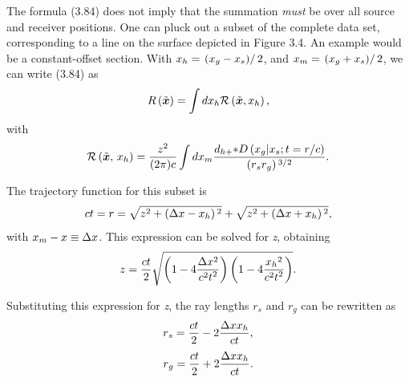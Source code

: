 The formula (3.84) does not imply that the summation \textit{must} be over all source and receiver positions. One can pluck out a subset of the
complete data set, corresponding to a line on the surface depicted in Figure 3.4. An example would be a constant-offset section. With \(x_h=\left.\left(x_g-x_s\right)\right/2\),
and \(x_m=\left.\left(x_g+x_s\right)\right/2\), we can write (3.84) as
\begin{equation}
\text{\textit{$R$}}\left(\tilde{\boldsymbol{x}}\right) = \int d\text{\textit{$x$}}_{\text{\textit{$h$}}}\text{\textit{$\mathcal{R}$}}\left(\tilde{\boldsymbol{x}},\text{\textit{$x_h$}}\right),\end{equation}
with
\begin{equation}\text{\textit{$\mathcal{R}$}}\left(\tilde{\boldsymbol{x}},\,\text{\textit{$x$}}_{\text{\textit{$h$}}}\right)
= \frac{\text{\textit{$z$}}^2}{(2\pi )\text{\textit{$c$}}} \int d\text{\textit{$x$}}_{\text{\textit{$m$}}}\frac{\text{\textit{$d_{h+}$}}\text{\textit{$*$}}\text{\textit{$D$}}\left(\text{\textit{$x$}}_{\text{\textit{$g$}}}|\text{\textit{$x$}}_{\text{\textit{$s$}}};\text{\textit{$t$}}=\text{\textit{$r$}}/\text{\textit{$c$}}\right)}{\left(\text{\textit{$r$}}_{\text{\textit{$s$}}}\text{\textit{$r$}}_{\text{\textit{$g$}}}\right){}^{3/2}}.\end{equation}

The trajectory function for this subset is
\begin{equation}\text{\textit{$c t$}}=\text{\textit{$r$}}=\sqrt{\text{\textit{$z$}}^2+\left(\Delta \text{\textit{$x$}}-\text{\textit{$x_h$}}\right){}^2}+\sqrt{\text{\textit{$z$}}^2+\left(\Delta
\text{\textit{$x$}}+\text{\textit{$x_h$}}\right){}^2},\end{equation}
with \(x_m-x\equiv \Delta \text{\textit{$x$}}\). This expression can be solved for \textit{z}, obtaining
\begin{equation}\text{\textit{$z$}}=\frac{\text{\textit{$c t$}}}{2\text{\textit{$ $}}}\sqrt{\left(1-4 \frac{\Delta \text{\textit{$x$}}^2}{\text{\textit{$c$}}^2\text{\textit{$t$}}^2}\right)\left(1-4
\frac{\text{\textit{$x_h$}}{}^2}{\text{\textit{$c$}}^2\text{\textit{$t$}}^2}\right)}.\end{equation}

Substituting this expression for \textit{z}, the ray lengths \(r_s\) and \(r_g\) can be rewritten as
\begin{equation}\text{\textit{$r$}}_{\text{\textit{$s$}}}=\frac{\text{\textit{$c t$}}}{2}-2\frac{\Delta \text{\textit{$x$}}\text{\textit{$ $}}\text{\textit{$x_h$}}}{\text{\textit{$c
t$}}},\end{equation}
\begin{equation}\text{\textit{$r$}}_{\text{\textit{$g$}}}=\frac{\text{\textit{$c t$}}}{2}+2\frac{\Delta \text{\textit{$x$}}\text{\textit{$ $}}\text{\textit{$x_h$}}}{\text{\textit{$c
t$}}}.\end{equation}

